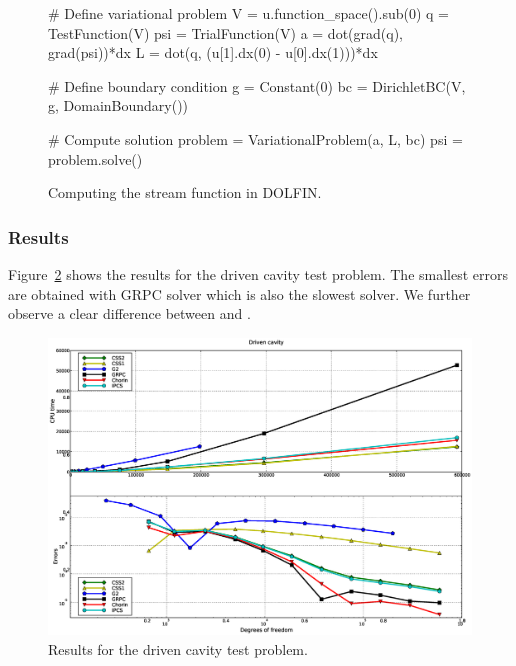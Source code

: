 \begin{figure}[htbp]
  \codesize
  \begin{center}
    \begin{python}
# Define variational problem
V   = u.function_space().sub(0)
q   = TestFunction(V)
psi = TrialFunction(V)
a   = dot(grad(q), grad(psi))*dx
L   = dot(q, (u[1].dx(0) - u[0].dx(1)))*dx

# Define boundary condition
g  = Constant(0)
bc = DirichletBC(V, g, DomainBoundary())

# Compute solution
problem = VariationalProblem(a, L, bc)
psi = problem.solve()
    \end{python}
    \caption{Computing the stream function in DOLFIN.}
    \label{fig:streamfunction}
  \end{center}
\end{figure}

\subsubsection{Results}

Figure~\ref{fig:drivencavity_CPU_and_errors} shows the results for the
driven cavity test problem.  The smallest errors are obtained with
GRPC solver which is also the slowest solver. We further observe a
clear difference between  and .

\begin{figure}
  \begin{center}
    \includegraphics[width=14cm]{chapters/kvs-1/eps/new_drivencavity_res.eps}
  \end{center}
  \caption{Results for the driven cavity test problem.}
  \label{fig:drivencavity_CPU_and_errors}
\end{figure}

